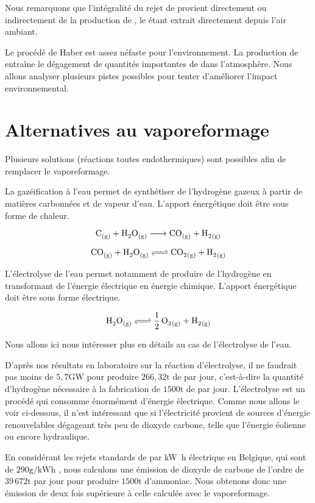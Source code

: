 \documentclass[a4paper, oneside, 12pt]{article}
\begin{document}
Nous remarquons que l'intégralité du rejet de  provient directement 
ou indirectement de la production de , le  étant extrait 
directement depuis l'air ambiant.

Le procédé de Haber est assez néfaste pour l'environnement. 
La production de  entraîne le dégagement de quantités 
importantes de  dans l'atmosphère.
Nous allons analyser plusieurs pistes possibles pour tenter 
d'améliorer l'impact environnemental.

\section*{Alternatives au vaporeformage}

Plusieurs solutions (réactions toutes endothermiques) 
sont possibles afin de remplacer le vaporeformage.

La gazéification à l'eau permet de synthétiser de l'hydrogène 
gazeux à partir de matières carbonnées et de vapeur d'eau.
L'apport énergétique doit être sous forme de chaleur. \cite{hydrogene}

\[ \ce{C_{(g)} + H2O_{(g)} -> CO_{(g)} + H2_{(g)}} \]

\[ \ce{CO_{(g)} + H2O_{(g)} <=> CO2_{(g)} + H2_{(g)}} \]

L'électrolyse de l'eau permet notamment de produire de l'hydrogène 
en transformant de l'énergie électrique en énergie chimique.
L'apport énergétique doit être sous forme électrique.

\[ \ce{H2O_{(g)} <=> \frac{1}{2} \, O2_{(g)} + H2_{(g)}} \]

Nous allons ici nous intéresser plus en détails au cas de l'électrolyse de l'eau. 

D'après nos résultats en laboratoire sur la réaction d'électrolyse, 
il ne faudrait pas moins de $5,7 \si{\giga\watt}$ 
pour produire $266,32\si{\tonne}$ de  par jour, 
c'est-à-dire la quantité d'hydrogène nécessaire 
à la fabrication de $1500\si{\tonne}$ de  par jour. 
L'électrolyse est un procédé qui consomme énormément d'énergie électrique. 
Comme nous allons le voir ci-dessous, il n'est intéressant que si 
l'électricité provient de sources d'énergie renouvelables dégageant 
très peu de dioxyde carbone, telle que l'énergie éolienne ou encore hydraulique.

En considérant les rejets standards de  par \si{\kilo\watt\hour} électrique 
en Belgique, qui sont de $290\si{\gram/\kilo\watt\hour}$ \cite{co2_europe},
nous calculons une émission de dioxyde de carbone de l'ordre de $39 \, 672\si{\tonne}$
par jour pour produire $1500\si{\tonne}$ d'ammoniac. 
Nous obtenons donc une émission de  deux fois 
supérieure à celle calculée avec le vaporeformage.
\end{document}
